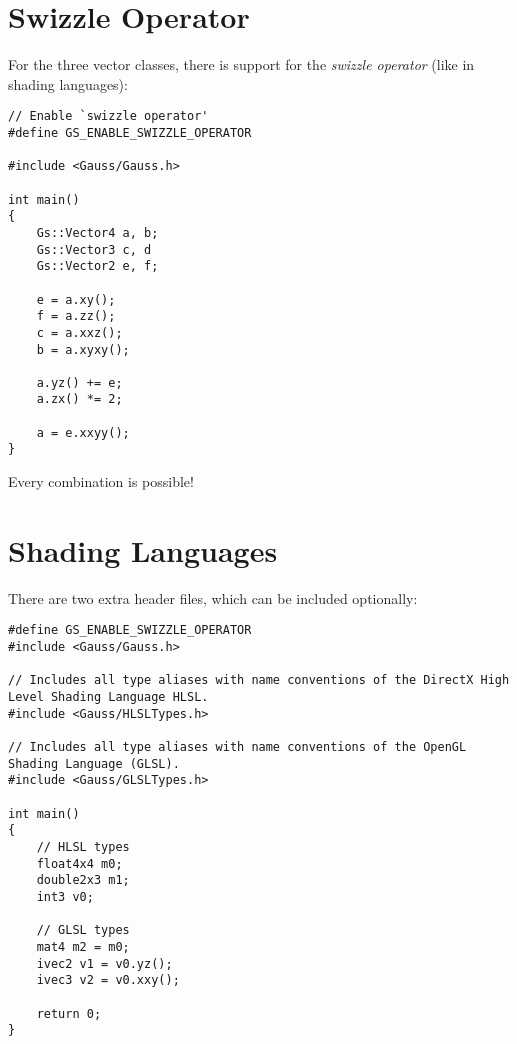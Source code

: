 \documentclass{article}
\begin{document}

\section*{Swizzle Operator}

For the three vector classes, there is support for the \textit{swizzle operator} (like in shading languages):
\begin{lstlisting}
// Enable `swizzle operator'
#define GS_ENABLE_SWIZZLE_OPERATOR

#include <Gauss/Gauss.h>

int main()
{
	Gs::Vector4 a, b;
	Gs::Vector3 c, d
	Gs::Vector2 e, f;
	
	e = a.xy();
	f = a.zz();
	c = a.xxz();
	b = a.xyxy();
	
	a.yz() += e;
	a.zx() *= 2;
	
	a = e.xxyy();
}
\end{lstlisting}
Every combination is possible!



\section*{Shading Languages}

There are two extra header files, which can be included optionally:
\begin{lstlisting}
#define GS_ENABLE_SWIZZLE_OPERATOR
#include <Gauss/Gauss.h>

// Includes all type aliases with name conventions of the DirectX High Level Shading Language HLSL.
#include <Gauss/HLSLTypes.h>

// Includes all type aliases with name conventions of the OpenGL Shading Language (GLSL).
#include <Gauss/GLSLTypes.h>

int main()
{
	// HLSL types
	float4x4 m0;
	double2x3 m1;
	int3 v0;
	
	// GLSL types
	mat4 m2 = m0;
	ivec2 v1 = v0.yz();
	ivec3 v2 = v0.xxy();
	
	return 0;
}
\end{lstlisting}


\end{document}
